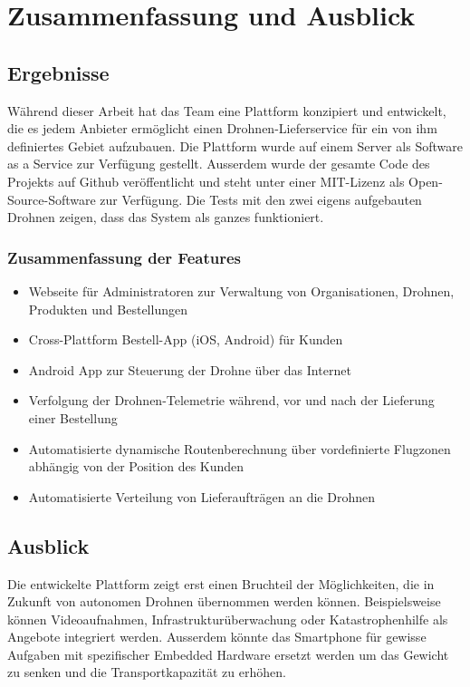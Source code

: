 \chapter{Zusammenfassung und Ausblick}

\section{Ergebnisse}

Während dieser Arbeit hat das Team eine Plattform konzipiert und entwickelt, die es jedem Anbieter ermöglicht einen Drohnen-Lieferservice für ein von ihm definiertes Gebiet aufzubauen. Die Plattform wurde auf einem Server als Software as a Service zur Verfügung gestellt. Ausserdem wurde der gesamte Code des Projekts auf Github veröffentlicht und steht unter einer \Gls{MIT-Lizenz} als Open-Source-Software zur Verfügung. Die Tests mit den zwei eigens aufgebauten Drohnen zeigen, dass das System als ganzes funktioniert.

\subsection{Zusammenfassung der Features}

\begin{itemize}
	\item Webseite für Administratoren zur Verwaltung von Organisationen, Drohnen, Produkten und Bestellungen
	\item Cross-Plattform Bestell-App (iOS, Android) für Kunden
	\item Android App zur Steuerung der Drohne über das Internet
	\item Verfolgung der Drohnen-Telemetrie während, vor und nach der Lieferung einer Bestellung
	\item Automatisierte dynamische Routenberechnung über vordefinierte Flugzonen abhängig von der Position des Kunden
	\item Automatisierte Verteilung von Lieferaufträgen an die Drohnen
\end{itemize}


\section{Ausblick}

Die entwickelte Plattform zeigt erst einen Bruchteil der Möglichkeiten, die in Zukunft von autonomen Drohnen übernommen werden können. Beispielsweise können Videoaufnahmen, Infrastrukturüberwachung oder Katastrophenhilfe als Angebote integriert werden. Ausserdem könnte das Smartphone für gewisse Aufgaben mit spezifischer Embedded Hardware ersetzt werden um das Gewicht zu senken und die Transportkapazität zu erhöhen. 

